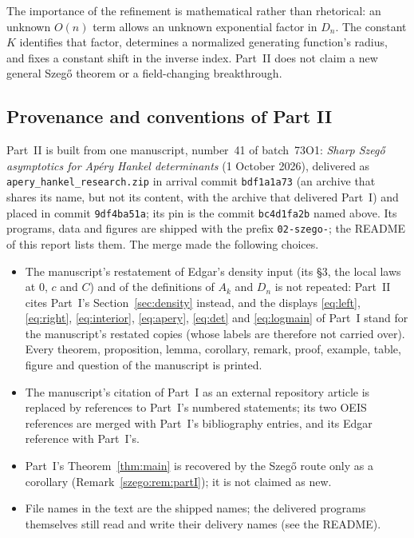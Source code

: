 \documentclass[11pt,a4paper]{article}
\numberwithin{equation}{section}
\theoremstyle{remark}\newtheorem{remark}[theorem]{Remark}
\begin{document}
The importance of the refinement is mathematical rather than rhetorical:
an unknown $O(n)$ term allows an unknown exponential factor in $D_n$.
The constant $K$ identifies that factor, determines a normalized generating
function's radius, and fixes a constant shift in the inverse index.
Part~II does not claim a new general Szeg\H{o} theorem or a field-changing
breakthrough.

\subsection{Provenance and conventions of Part II}
\label{szego:sec:provenance}
Part~II is built from one manuscript, number~41 of batch~73O1:
\emph{Sharp Szeg\H{o} asymptotics for Ap\'ery Hankel determinants}
(1 October 2026), delivered as \texttt{apery\_hankel\_research.zip} in
arrival commit \texttt{bdf1a1a73} (an archive that shares its name, but not
its content, with the archive that delivered Part~I) and placed in commit
\texttt{9df4ba51a}; its pin is the commit \texttt{bc4d1fa2b} named above.
Its programs, data and figures are shipped with the prefix \texttt{02-szego-};
the README of this report lists them. The merge made the following choices.
\begin{itemize}[leftmargin=*,itemsep=1pt]
\item The manuscript's restatement of Edgar's density input (its \S3, the
local laws at $0$, $c$ and $C$) and of the definitions of $A_k$ and $D_n$ is
not repeated: Part~II cites Part~I's Section~\ref{sec:density} instead, and the
displays \eqref{eq:left}, \eqref{eq:right}, \eqref{eq:interior},
\eqref{eq:apery}, \eqref{eq:det} and \eqref{eq:logmain} of Part~I stand for the
manuscript's restated copies (whose labels are therefore not carried over).
Every theorem, proposition, lemma, corollary, remark, proof, example, table,
figure and question of the manuscript is printed.
\item The manuscript's citation of Part~I as an external repository article
is replaced by references to Part~I's numbered statements; its two OEIS
references are merged with Part~I's bibliography entries, and its Edgar
reference with Part~I's.
\item Part~I's Theorem~\ref{thm:main} is recovered by the Szeg\H{o} route
only as a corollary (Remark~\ref{szego:rem:partI}); it is not claimed as new.
\item File names in the text are the shipped names; the delivered programs
themselves still read and write their delivery names (see the README).
\end{itemize}
\end{document}
